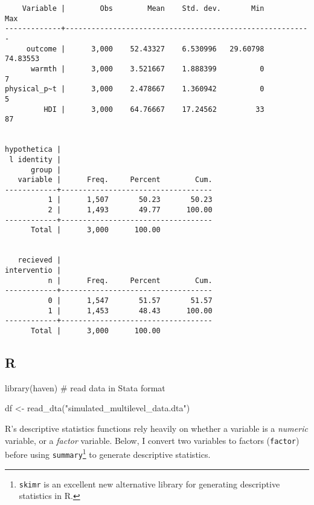 \documentclass[
  letterpaper,
  DIV=11,
  numbers=noendperiod]{scrreprt}
\newenvironment{Shaded}{\begin{snugshade}}{\end{snugshade}}
\newcommand{\CommentTok}[1]{\textcolor[rgb]{0.37,0.37,0.37}{#1}}
\newcommand{\FunctionTok}[1]{\textcolor[rgb]{0.28,0.35,0.67}{#1}}
\newcommand{\NormalTok}[1]{\textcolor[rgb]{0.00,0.23,0.31}{#1}}
\newcommand{\OtherTok}[1]{\textcolor[rgb]{0.00,0.23,0.31}{#1}}
\newcommand{\SpecialCharTok}[1]{\textcolor[rgb]{0.37,0.37,0.37}{#1}}
\newcommand{\StringTok}[1]{\textcolor[rgb]{0.13,0.47,0.30}{#1}}
\begin{document}
\begin{verbatim}
    Variable |        Obs        Mean    Std. dev.       Min        Max
-------------+---------------------------------------------------------
     outcome |      3,000    52.43327    6.530996   29.60798   74.83553
      warmth |      3,000    3.521667    1.888399          0          7
physical_p~t |      3,000    2.478667    1.360942          0          5
         HDI |      3,000    64.76667    17.24562         33         87


hypothetica |
 l identity |
      group |
   variable |      Freq.     Percent        Cum.
------------+-----------------------------------
          1 |      1,507       50.23       50.23
          2 |      1,493       49.77      100.00
------------+-----------------------------------
      Total |      3,000      100.00


   recieved |
interventio |
          n |      Freq.     Percent        Cum.
------------+-----------------------------------
          0 |      1,547       51.57       51.57
          1 |      1,453       48.43      100.00
------------+-----------------------------------
      Total |      3,000      100.00
\end{verbatim}

\subsection{R}

\begin{Shaded}
\begin{Highlighting}[]
\FunctionTok{library}\NormalTok{(haven) }\CommentTok{\# read data in Stata format}

\NormalTok{df }\OtherTok{\textless{}{-}} \FunctionTok{read\_dta}\NormalTok{(}\StringTok{"simulated\_multilevel\_data.dta"}\NormalTok{)}
\end{Highlighting}
\end{Shaded}

R's descriptive statistics functions rely heavily on whether a variable
is a \emph{numeric} variable, or a \emph{factor} variable. Below, I
convert two variables to factors (\texttt{factor}) before using
\texttt{summary}\footnote{\texttt{skimr} is an excellent new alternative
  library for generating descriptive statistics in R.} to generate
descriptive statistics.

\begin{Shaded}
\end{Shaded}
\end{document}
